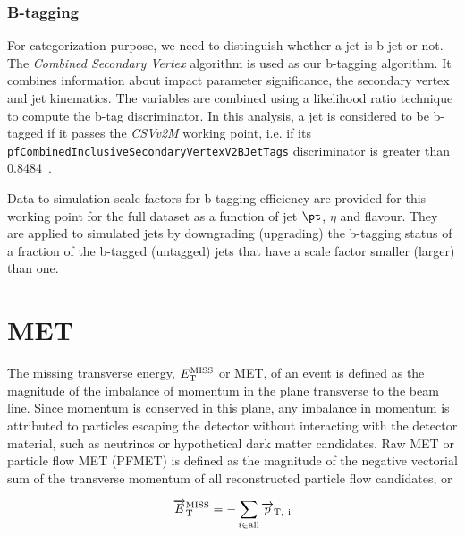 

\subsubsection{B-tagging}

For categorization purpose, we need to distinguish whether a jet is b-jet or not.
The \emph{Combined Secondary Vertex} algorithm is used as our b-tagging algorithm.
It combines information about impact parameter significance,
the secondary vertex and jet kinematics.
The variables are combined using a likelihood ratio technique to compute the b-tag discriminator.
In this analysis, a jet is considered to be b-tagged if it passes the \emph{CSVv2M} working point,
i.e. if its \verb|pfCombinedInclusiveSecondaryVertexV2BJetTags| discriminator is greater than 0.8484~\cite{btagReferenceEffsRun2}.

Data to simulation scale factors for b-tagging efficiency are provided for this working point for the full dataset as a function of jet $\pt$, $\eta$ and flavour.
They are applied to simulated jets by downgrading (upgrading) the b-tagging status of a fraction of the b-tagged (untagged) jets that have a scale factor smaller (larger) than one.

\section{MET}

The missing transverse energy, $E_{\rm{T}}^{\rm{MISS}}$ or MET, of an event is defined as the magnitude of the imbalance of momentum in the plane transverse to the beam line. Since momentum is conserved in this plane, any imbalance in momentum is attributed to particles escaping the detector without interacting with the detector material, such as neutrinos or hypothetical dark matter candidates. Raw MET or particle flow MET (PFMET) is defined as the magnitude of the negative vectorial sum of the transverse momentum of all reconstructed particle flow candidates, or

\begin{equation}
\overrightarrow{E}_{\rm{T}}^{\rm{MISS}} = - \sum_{i \in \rm{all}} \overrightarrow{p}_{\rm{T},\ i}
\end{equation}

